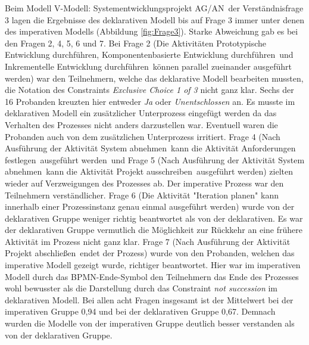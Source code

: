 Beim Modell \grqq V-Modell: Systementwicklungsprojekt AG/AN\grqq \ der Verständnisfrage 3 lagen die Ergebnisse des deklarativen Modell bis auf Frage 3 immer unter denen des imperativen Modells (Abbildung \ref{fig:Frage3}). Starke Abweichung gab es bei den Fragen 2, 4, 5, 6 und 7. \newline
Bei Frage 2 (\grqq Die Aktivitäten \grqq Prototypische Entwicklung durchführen\grqq, \grqq Komponentenbasierte Entwicklung durchführen\grqq \ und \grqq Inkrementelle Entwicklung durchführen\grqq \ können parallel zueinander ausgeführt werden\grqq) war den Teilnehmern, welche das deklarative Modell bearbeiten mussten, die Notation des Constraints \textit {Exclusive Choice 1 of 3} nicht ganz klar. Sechs der 16 Probanden kreuzten hier entweder \textit{Ja} oder \textit{Unentschlossen} an. Es musste im deklarativen Modell ein zusätzlicher Unterprozess eingefügt werden da das Verhalten des Prozesses nicht anders darzustellen war. Eventuell waren die Probanden auch von dem zusätzlichen Unterprozess irritiert.\newline
Frage 4 (\grqq Nach Ausführung der Aktivität \grqq System abnehmen\grqq \ kann die Aktivität \grqq Anforderungen festlegen\grqq \ ausgeführt werden\grqq \ und Frage 5 (\grqq Nach Ausführung der Aktivität \grqq System abnehmen\grqq \ kann die Aktivität \grqq Projekt ausschreiben\grqq \ ausgeführt werden\grqq) zielten wieder auf Verzweigungen des Prozesses ab. Der imperative Prozess war den Teilnehmern verständlicher. \newline
Frage 6 (\grqq Die Aktivität "Iteration planen" kann innerhalb einer Prozessinstanz genau einmal ausgeführt werden\grqq) wurde von der deklarativen Gruppe weniger richtig beantwortet als von der deklarativen. Es war der deklarativen Gruppe vermutlich die Möglichkeit zur Rückkehr an eine frühere Aktivität im Prozess nicht ganz klar. \newline
Frage 7 (\grqq Nach Ausführung der Aktivität \grqq Projekt abschließen\grqq \ endet der Prozess\grqq) wurde von den Probanden, welchen das imperative Modell gezeigt wurde, richtiger beantwortet. Hier war im imperativen Modell durch das BPMN-Ende-Symbol den Teilnehmern das Ende des Prozesses wohl bewusster als die Darstellung durch das Constraint \textit{not succession} im deklarativen Modell.\newline
Bei allen acht Fragen insgesamt ist der Mittelwert bei der imperativen Gruppe 0,94 und bei der deklarativen Gruppe 0,67. Demnach wurden die Modelle von der imperativen Gruppe deutlich besser verstanden als von der deklarativen Gruppe. \newline


